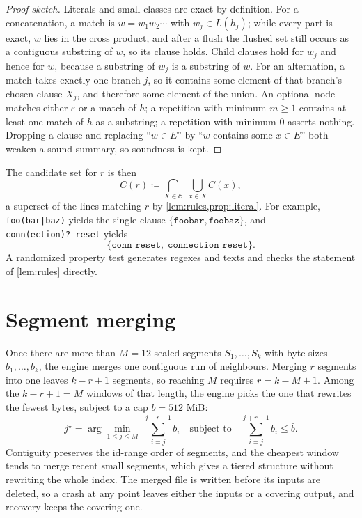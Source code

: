 \documentclass[11pt]{article}
\theoremstyle{plain}
\theoremstyle{definition}
\theoremstyle{remark}
\newcommand{\code}[1]{\texttt{#1}}
\begin{document}
\begin{proof}[Proof sketch]
Literals and small classes are exact by definition. For a concatenation, a match
is $w = w_1 w_2 \cdots$ with $w_j \in L(h_j)$; while every part is exact, $w$ lies
in the cross product, and after a flush the flushed set still occurs as a
contiguous substring of $w$, so its clause holds. Child clauses hold for $w_j$
and hence for $w$, because a substring of $w_j$ is a substring of $w$. For an
alternation, a match takes exactly one branch $j$, so it contains some element
of that branch's chosen clause $X_j$, and therefore some element of the union.
An optional node matches either $\varepsilon$ or a match of $h$; a repetition with
minimum $m \ge 1$ contains at least one match of $h$ as a substring; a repetition
with minimum $0$ asserts nothing. Dropping a clause and replacing \enquote{$w \in
E$} by \enquote{$w$ contains some $x \in E$} both weaken a sound summary, so
soundness is kept.
\end{proof}

The candidate set for $r$ is then
\begin{equation}\label{eq:regex}
  C(r) \coloneqq \bigcap_{X \in \mathcal{C}} \; \bigcup_{x \in X} C(x),
\end{equation}
a superset of the lines matching $r$ by \cref{lem:rules,prop:literal}. For
example, \code{foo(bar|baz)} yields the single clause
$\{\code{foobar}, \code{foobaz}\}$, and \code{conn(ection)?\ reset} yields
\[
  \{\code{conn reset},\; \code{connection reset}\}.
\]
A randomized property test generates regexes and texts and checks the statement
of \cref{lem:rules} directly.

\section{Segment merging}\label{sec:merge}

Once there are more than $M = 12$ sealed segments $S_1, \ldots, S_k$ with byte
sizes $b_1, \ldots, b_k$, the engine merges one contiguous run of neighbours.
Merging $r$ segments into one leaves $k - r + 1$ segments, so reaching $M$
requires $r = k - M + 1$. Among the $k - r + 1 = M$ windows of that length, the
engine picks the one that rewrites the fewest bytes, subject to a cap
$\bar{b} = 512$ MiB:
\begin{equation}
  j^\star = \arg\min_{1 \le j \le M} \; \sum_{i=j}^{j+r-1} b_i
  \quad\text{subject to}\quad \sum_{i=j}^{j+r-1} b_i \le \bar{b}.
\end{equation}
Contiguity preserves the id-range order of segments, and the cheapest window
tends to merge recent small segments, which gives a tiered structure without
rewriting the whole index. The merged file is written before its inputs are
deleted, so a crash at any point leaves either the inputs or a covering output,
and recovery keeps the covering one.
\end{document}
